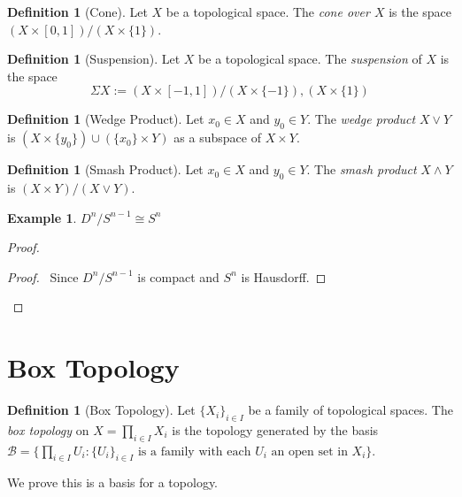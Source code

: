 \documentclass{book}
\let\qed\relax
\theoremstyle{definition}
\newtheorem{df}[ax]{Definition}
\newtheorem{ex}[ax]{Example}
\begin{document}
\begin{df}[Cone]
Let $X$ be a topological space. The \emph{cone over $X$} is the space $(X \times [0,1]) / (X \times \{1\})$.
\end{df}

\begin{df}[Suspension]
Let $X$ be a topological space. The \emph{suspension} of $X$ is the space
\[ \Sigma X := (X \times [-1,1]) / (X \times \{-1\}),(X \times \{1\}) \]
\end{df}

\begin{df}[Wedge Product]
Let $x_0 \in X$ and $y_0 \in Y$. The \emph{wedge product} $X \vee Y$ is $(X \times \{y_0\}) \cup (\{x_0\} \times Y)$ as a subspace of $X \times Y$.
\end{df}

\begin{df}[Smash Product]
Let $x_0 \in X$ and $y_0 \in Y$. The \emph{smash product} $X \wedge Y$ is $(X \times Y) / (X \vee Y)$.
\end{df}

\begin{ex}
$D^n / S^{n-1} \cong S^n$
\end{ex}

\begin{proof}
\pf
{}
\begin{proof}
	\pf\ Since $D^n / S^{n-1}$ is compact and $S^n$ is Hausdorff.
\end{proof}
\qed
\end{proof}

\section{Box Topology}

\begin{df}[Box Topology]
Let $\{ X_i \}_{i \in I}$ be a family of topological spaces. The \emph{box topology} on $X = \prod_{i \in I} X_i$ is the topology generated by the basis $\mathcal{B} = \{ \prod_{i \in I} U_i: \{U_i\}_{i \in I} \text{ is a family with each } U_i \text{ an open set in } X_i \}$.

We prove this is a basis for a topology.
\end{df}
\end{document}
